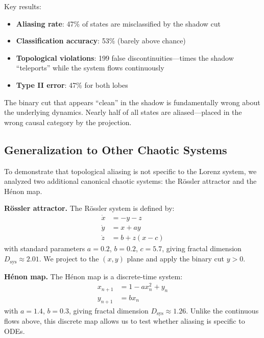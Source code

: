 \documentclass[12pt]{article}
\begin{document}
Key results:
\begin{itemize}
    \item \textbf{Aliasing rate}: 47\% of states are misclassified by the shadow cut
    \item \textbf{Classification accuracy}: 53\% (barely above chance)
    \item \textbf{Topological violations}: 199 false discontinuities---times the shadow ``teleports'' while the system flows continuously
    \item \textbf{Type II error}: 47\% for both lobes
\end{itemize}

The binary cut that appears ``clean'' in the shadow is fundamentally wrong about the underlying dynamics. Nearly half of all states are aliased---placed in the wrong causal category by the projection.

\subsection{Generalization to Other Chaotic Systems}

To demonstrate that topological aliasing is not specific to the Lorenz system, we analyzed two additional canonical chaotic systems: the Rössler attractor and the Hénon map.

\textbf{Rössler attractor.} The Rössler system \cite{rossler1976} is defined by:
\begin{align}
\dot{x} &= -y - z \\
\dot{y} &= x + ay \\
\dot{z} &= b + z(x - c)
\end{align}
with standard parameters $a = 0.2$, $b = 0.2$, $c = 5.7$, giving fractal dimension $D_{\text{sys}} \approx 2.01$. We project to the $(x, y)$ plane and apply the binary cut $y > 0$.

\textbf{Hénon map.} The Hénon map \cite{henon1976} is a discrete-time system:
\begin{align}
x_{n+1} &= 1 - ax_n^2 + y_n \\
y_{n+1} &= bx_n
\end{align}
with $a = 1.4$, $b = 0.3$, giving fractal dimension $D_{\text{sys}} \approx 1.26$. Unlike the continuous flows above, this discrete map allows us to test whether aliasing is specific to ODEs.
\end{document}

